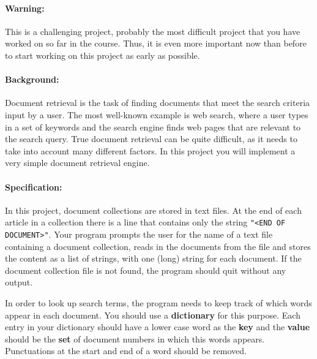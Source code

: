 
\paragraph{Warning:}
This is a challenging project, probably the most difficult project that you have worked on so far in the course. 
Thus, it is even more important now than before to start working on this project as early as possible.

\paragraph{Background:} 
Document retrieval is the task of finding documents that meet the search criteria input by a user. 
The most well-known example is web search, where a user types in a set of keywords and the search engine finds web pages that are relevant to the search query. 
True document retrieval can be quite difficult, as it needs to take into account many different factors. 
In this project you will implement a very simple document retrieval engine.

\paragraph{Specification:}
In this project, document collections are stored in text files. 
At the end of each article in a collection there is a line that contains only the string \texttt{"<END OF DOCUMENT>"}. 
Your program prompts the user for the name of a text file containing a document collection, reads in the documents from the file and stores the content as a list of strings, with one (long) string for each document. 
If the document collection file is not found, the program should quit without any output.

In order to look up search terms, the program needs to keep track of which words appear in each document. 
You should use a \textbf{dictionary} for this purpose. 
Each entry in your dictionary should have a lower case word as the \textbf{key} and the \textbf{value} should be the \textbf{set} of document numbers in which this words appears.
Punctuations at the start and end of a word should be removed. 

